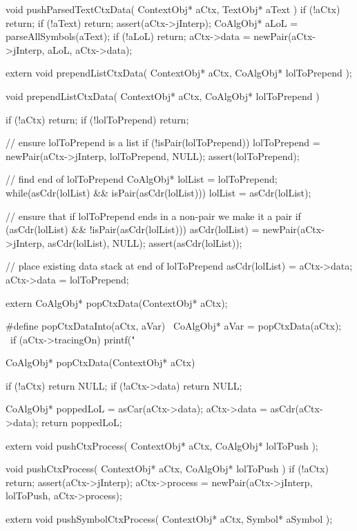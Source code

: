 \startCCode
void pushParsedTextCtxData(
  ContextObj* aCtx,
  TextObj* aText
) {
  if (!aCtx) return;
  if (!aText) return;
  assert(aCtx->jInterp);
  CoAlgObj* aLoL = parseAllSymbols(aText);
  if (!aLoL) return;
  aCtx->data = newPair(aCtx->jInterp, aLoL, aCtx->data);
}
\stopCCode

\startCHeader
extern void prependListCtxData(
  ContextObj* aCtx,
  CoAlgObj* lolToPrepend
);
\stopCHeader

\startCCode
void prependListCtxData(
  ContextObj* aCtx,
  CoAlgObj* lolToPrepend
) {
  if (!aCtx) return;
  if (!lolToPrepend) return;

  // ensure lolToPrepend is a list
  if (!isPair(lolToPrepend)) {
    lolToPrepend = newPair(aCtx->jInterp, lolToPrepend, NULL);
    assert(lolToPrepend);
  }

  // find end of lolToPrepend
  CoAlgObj* lolList = lolToPrepend;
  while(asCdr(lolList) && isPair(asCdr(lolList))) {
    lolList = asCdr(lolList);
  }

  // ensure that if lolToPrepend ends in a non-pair we make it a pair
  if (asCdr(lolList) && !isPair(asCdr(lolList))) {
    asCdr(lolList) = newPair(aCtx->jInterp, asCdr(lolList), NULL);
    assert(asCdr(lolList));
  }

  // place existing data stack at end of lolToPrepend
  asCdr(lolList) = aCtx->data;
  aCtx->data     = lolToPrepend;
}
\stopCCode

\startCHeader
extern CoAlgObj* popCtxData(ContextObj* aCtx);

#define popCtxDataInto(aCtx, aVar)                              \
CoAlgObj* aVar = popCtxData(aCtx);                              \
if (aCtx->tracingOn) printf("%
\stopCHeader

\startCCode
CoAlgObj* popCtxData(ContextObj* aCtx) {
  if (!aCtx) return NULL;
  if (!aCtx->data) return NULL;

  CoAlgObj* poppedLoL = asCar(aCtx->data);
  aCtx->data          = asCdr(aCtx->data);
  return poppedLoL;
}
\stopCCode

\startCHeader
extern void pushCtxProcess(
  ContextObj* aCtx,
  CoAlgObj* lolToPush
);
\stopCHeader

\startCCode
void pushCtxProcess(
  ContextObj* aCtx,
  CoAlgObj* lolToPush
) {
  if (!aCtx) return;
  assert(aCtx->jInterp);
  aCtx->process = newPair(aCtx->jInterp, lolToPush, aCtx->process);
}
\stopCCode

\startCHeader
extern void pushSymbolCtxProcess(
  ContextObj* aCtx,
  Symbol* aSymbol
);
\stopCHeader


